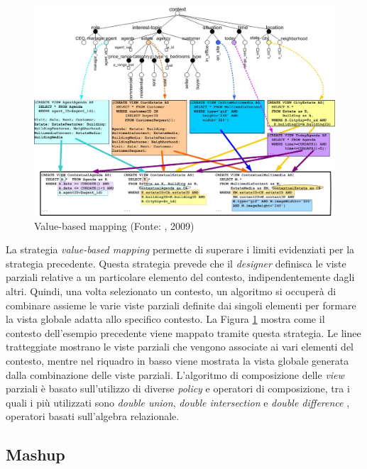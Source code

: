\begin{figure}[ht]
	\centering
	\includegraphics[width=\textwidth]{2-preliminari/Immagini/value-based-mapping.jpg}
	\caption[Value-based mapping]{Value-based mapping (Fonte: \cite{DBLP:journals/cacm/BolchiniCOQRST09}, 2009)}\label{fig:value-based-mapping}
\end{figure}

La strategia \emph{value-based mapping} permette di superare i limiti evidenziati per la strategia precedente. Questa strategia prevede che il \emph{designer} definisca le viste parziali relative a un particolare elemento del contesto, indipendentemente dagli altri. Quindi, una volta selezionato un contesto, un algoritmo si occuperà di combinare assieme le varie viste parziali definite dai singoli elementi per formare la vista globale adatta allo specifico contesto. La Figura \ref{fig:value-based-mapping} mostra come il contesto dell'esempio precedente viene mappato tramite questa strategia. Le linee tratteggiate mostrano le viste parziali che vengono associate ai vari elementi del contesto, mentre nel riquadro in basso viene mostrata la vista globale generata dalla combinazione delle viste parziali. L'algoritmo di composizione delle \emph{view} parziali è basato sull'utilizzo di diverse \emph{policy} e operatori di composizione, tra i quali i più utilizzati sono \emph{double union}, \emph{double intersection} e \emph{double difference} \cite{DBLP:conf/er/BolchiniQR07}, operatori basati sull'algebra relazionale.

\subsection{Mashup\label{sec:mashup}}

